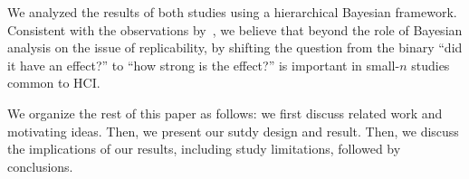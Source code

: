 We analyzed the results of both studies using a hierarchical Bayesian framework. Consistent with the observations by~\textcite{Kay2016}, we believe that beyond the role of Bayesian analysis on the issue of replicability, by shifting the question from the binary ``did it have an effect?'' to ``how strong is the effect?'' is important in small-$n$ studies common to HCI.


We organize the rest of this paper as follows: we first discuss related work and motivating ideas. Then, we present our sutdy design and result. Then, we discuss the implications of our results, including study limitations, followed by conclusions.





